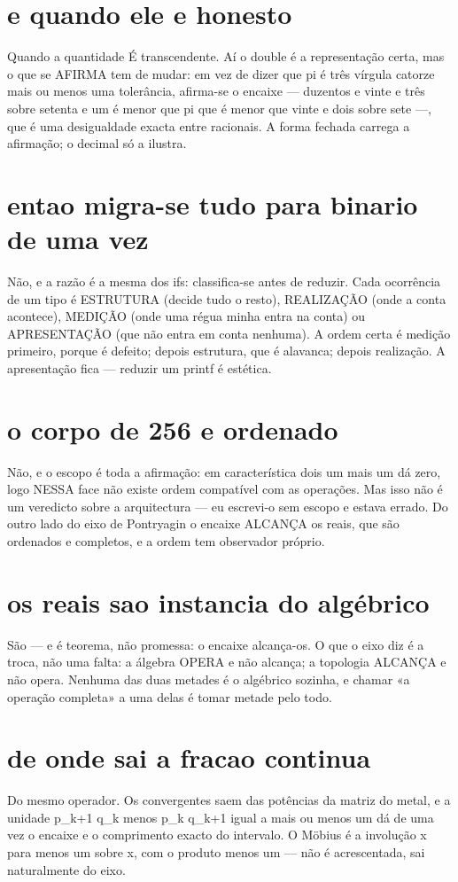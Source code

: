 \documentclass[11pt,a4paper]{article}
\begin{document}
\section{e quando ele e honesto}
Quando a quantidade É transcendente. Aí o double é a representação certa, mas o que se
AFIRMA tem de mudar: em vez de dizer que pi é três vírgula catorze mais ou menos uma
tolerância, afirma-se o encaixe — duzentos e vinte e três sobre setenta e um é menor que pi
que é menor que vinte e dois sobre sete —, que é uma desigualdade exacta entre racionais. A
forma fechada carrega a afirmação; o decimal só a ilustra.

\section{entao migra-se tudo para binario de uma vez}
Não, e a razão é a mesma dos ifs: classifica-se antes de reduzir. Cada ocorrência de um
tipo é ESTRUTURA (decide tudo o resto), REALIZAÇÃO (onde a conta acontece), MEDIÇÃO (onde
uma régua minha entra na conta) ou APRESENTAÇÃO (que não entra em conta nenhuma). A ordem
certa é medição primeiro, porque é defeito; depois estrutura, que é alavanca; depois
realização. A apresentação fica — reduzir um printf é estética.

\section{o corpo de 256 e ordenado}
Não, e o escopo é toda a afirmação: em característica dois um mais um dá zero, logo NESSA
face não existe ordem compatível com as operações. Mas isso não é um veredicto sobre a
arquitectura — eu escrevi-o sem escopo e estava errado. Do outro lado do eixo de
Pontryagin o encaixe ALCANÇA os reais, que são ordenados e completos, e a ordem tem
observador próprio.

\section{os reais sao instancia do algébrico}
São — e é teorema, não promessa: o encaixe alcança-os. O que o eixo diz é a troca, não uma
falta: a álgebra OPERA e não alcança; a topologia ALCANÇA e não opera. Nenhuma das duas
metades é o algébrico sozinha, e chamar «a operação completa» a uma delas é tomar metade
pelo todo.

\section{de onde sai a fracao continua}
Do mesmo operador. Os convergentes saem das potências da matriz do metal, e a unidade
p_{k+1} q_k menos p_k q_{k+1} igual a mais ou menos um dá de uma vez o encaixe e o
comprimento exacto do intervalo. O Möbius é a involução x para menos um sobre x, com o
produto menos um — não é acrescentada, sai naturalmente do eixo.
\end{document}
